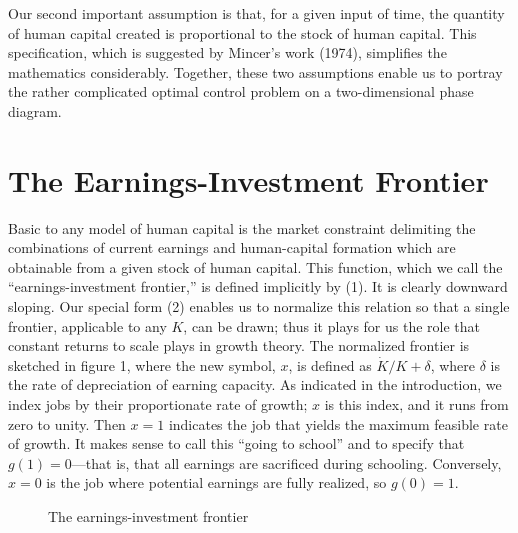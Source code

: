 \documentclass[11pt,fleqn]{article}
\begin{document}
Our second important assumption is that, for a given input of time, the quantity of human capital created is proportional to the stock of human capital. This specification, which is suggested by Mincer's work (1974), simplifies the mathematics considerably. Together, these two assumptions enable us to portray the rather complicated optimal control problem on a two-dimensional phase diagram.

\section{The Earnings-Investment Frontier}

Basic to any model of human capital is the market constraint delimiting the combinations of current earnings and human-capital formation which are obtainable from a given stock of human capital. This function, which we call the ``earnings-investment frontier,'' is defined implicitly by (1). It is clearly downward sloping. Our special form (2) enables us to normalize this relation so that a single frontier, applicable to any $K$, can be drawn; thus it plays for us the role that constant returns to scale plays in growth theory. The normalized frontier is sketched in figure 1, where the new symbol, $x$, is defined as $\dot{K}/K + \delta$, where $\delta$ is the rate of depreciation of earning capacity. As indicated in the introduction, we index jobs by their proportionate rate of growth; $x$ is this index, and it runs from zero to unity. Then $x = 1$ indicates the job that yields the maximum feasible rate of growth. It makes sense to call this ``going to school'' and to specify that $g(1) = 0$---that is, that all earnings are sacrificed during schooling. Conversely, $x = 0$ is the job where potential earnings are fully realized, so $g(0) = 1$.

\begin{figure}[htbp]
\centering
{}
\caption{The earnings-investment frontier}
\label{fig:frontier}
\end{figure}
\end{document}
